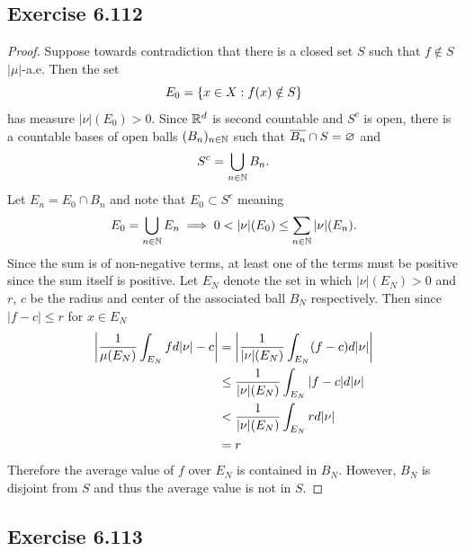\documentclass[hw_all.tex]{subfiles}
\begin{document}
\subsection{Exercise 6.112}

\begin{proof}
    Suppose towards contradiction that there is a closed set $S$ such that $f \notin S$ $|\mu|$-a.e. Then the set
    \[
        E_0 = \qty{x \in X : f(x) \notin S}
    \]
    has measure $|\nu|(E_0) > 0$. Since $\mathbb{R}^d$ is second countable and $S^c$ is open, there is a countable bases of open balls $(B_n)_{n \in \mathbb{N}}$ such that $\overline{B_n} \cap S = \varnothing$ and
    \[
        S^c = \bigcup_{n \in \mathbb{N}} B_n
    .\]
    Let $E_n = E_0 \cap B_n$ and note that $E_0 \subset S^c$ meaning
    \[
        E_0 = \bigcup_{n \in \mathbb{N}} E_n \implies 0 < |\nu|(E_0) \leq \sum_{n \in \mathbb{N}} |\nu|(E_n)
    .\]
    Since the sum is of non-negative terms, at least one of the terms must be positive since the sum itself is positive. Let $E_N$ denote the set in which $|\nu|(E_N) > 0$ and $r$, $c$ be the radius and center of the associated ball $B_N$ respectively. Then since $|f-c| \leq r$ for $x \in E_N$
    \begin{align*}
        \left|\frac{1}{\mu(E_N)} \int_{E_N} f d|\nu| - c \right| &= \left|\frac{1}{|\nu|(E_N)} \int_{E_N} (f - c) d|\nu|\right| \\
                                                         &\leq \frac{1}{|\nu|(E_N)} \int_{E_N} \qty|f - c| d|\nu| \\
                                                         &< \frac{1}{|\nu|(E_N)} \int_{E_N} r d|\nu| \\
                                                         &= r
    \end{align*}
    Therefore the average value of $f$ over $E_N$ is contained in $B_N$. However, $B_N$ is disjoint from $S$ and thus the average value is not in $S$.
\end{proof}

\subsection{Exercise 6.113}
\end{document}

